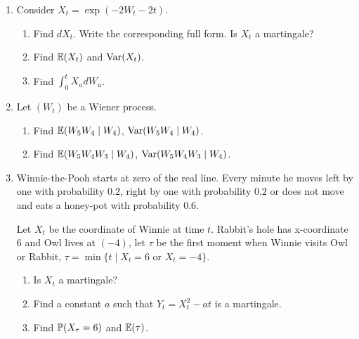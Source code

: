 \documentclass[12pt, a4paper]{article}
\begin{document}
\begin{enumerate}

  
  
  \item Consider $X_t = \exp(-2W_t - 2t)$.
  \begin{enumerate}
      \item Find $dX_t$. Write the corresponding full form. Is $X_t$ a martingale?
      \item Find $\E(X_t)$ and $\Var(X_t)$.
      \item Find $\int_0^t X_u dW_u$.
  \end{enumerate}
  
  
  \item Let $(W_t)$ be a Wiener process.
  \begin{enumerate}
      \item Find $\E(W_5 W_4 \mid W_4)$, $\Var(W_5 W_4 \mid W_4)$.
      \item Find $\E(W_5 W_4 W_3 \mid W_4)$, $\Var(W_5 W_4 W_3 \mid W_4)$.
  \end{enumerate}
  
  \item Winnie-the-Pooh starts at zero of the real line. 
  Every minute he moves left by one with probability $0.2$, right by one with probability $0.2$ 
  or does not move and eats a honey-pot with probability $0.6$. 
  
  
  Let $X_t$ be the coordinate of Winnie at time $t$. Rabbit's hole has x-coordinate $6$ and Owl lives at $(-4)$,
  let $\tau$ be the first moment when Winnie visits Owl or Rabbit, $\tau = \min\{t \mid X_t = 6 \text{ or } X_t = -4\}$.
  
  \begin{enumerate}
      \item Is $X_t$ a martingale?
      \item Find a constant $a$ such that $Y_t = X_t^2 - at$ is a martingale. 
      \item Find $\P(X_{\tau} = 6)$ and $\E(\tau)$.
  \end{enumerate}
  

\end{enumerate}
\end{document}
